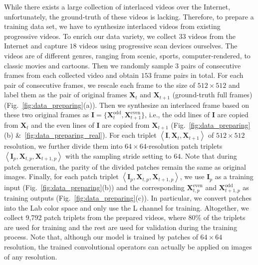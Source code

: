 \documentclass[acmtog]{acmart}
\begin{document}
While there exists a large collection of interlaced videos over the Internet,
unfortunately, the ground-truth of these videos is lacking. Therefore, to
prepare a training data set, we have to synthesize
interlaced videos from existing progressive videos. To enrich our data variety, we
collect $33$ videos from the Internet and capture $18$ videos using progressive
scan devices ourselves. The videos are of different genres, ranging from 
scenic, sports, computer-rendered, to classic movies and cartoons. Then we randomly sample $3$ pairs of consecutive frames from each collected
video and obtain $153$ frame pairs in total. For each pair of consecutive
frames, we rescale each frame to the size of $512\times512$ and label them as the
pair of original frames $\mathbf{X}_t$ and $\mathbf{X}_{t+1}$ (ground-truth full frames)
(Fig.~\ref{fig:data_preparing}(a)). Then we synthesize an interlaced frame based
on these two original frames as
$\mathbf{I}=\{\mathbf{X}^{\text{odd}}_t,\mathbf{X}^{\text{even}}_{t+1}\}$, i.e.,
the odd lines of $\mathbf{I}$ are copied from $\mathbf{X}_t$ and the even lines
of $\mathbf{I}$ are copied from $\mathbf{X}_{t+1}$
(Fig.~\ref{fig:data_preparing}(b) \&~\ref{fig:data_preparing_real}). For
each triplet $\left\langle \mathbf{I}, \mathbf{X}_t,
\mathbf{X}_{t+1}\right\rangle $ of $512\times512$ resolution, we further divide
them into $64\times64$-resolution patch triplets $\left\langle \mathbf{I}_{p},
\mathbf{X}_{t,p}, \mathbf{X}_{t+1,p}\right\rangle$ with the sampling stride
setting to $64$.  Note that during patch generation, the parity of the divided
patches remain the same as original images. Finally, for each patch triplet
$\left\langle \mathbf{I}_{p}, \mathbf{X}_{t,p}, \mathbf{X}_{t+1,p}\right\rangle
$, we use $\mathbf{I}_{p}$ as a training input
(Fig.~\ref{fig:data_preparing}(b)) and the corresponding
$\mathbf{X}^{\text{even}}_{t,p}$ and $\mathbf{X}^{\text{odd}}_{t+1,p}$ as
training outputs (Fig.~\ref{fig:data_preparing}(c)). In particular, we convert
patches into the Lab color space and only use the L channel for training. Altogether, we
collect 9,792 patch triplets from the prepared videos, where $80\%$ of
the triplets are used for training and the rest are used for validation during
the training process. Note that, although our model is trained by patches of
$64\times64$ resolution, the trained convolutional operators can actually be
applied on images of any resolution.
\end{document}
